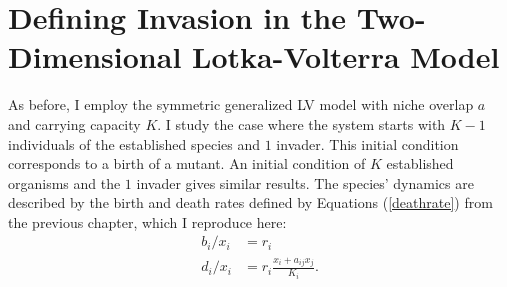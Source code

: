 \section{Defining Invasion in the Two-Dimensional Lotka-Volterra Model}

As before, I employ the symmetric generalized LV model with niche overlap $a$ and carrying capacity $K$. 
I study the case where the system starts with $K-1$ individuals of the established species and $1$ invader. 
This initial condition corresponds to a birth of a mutant. 
An initial condition of $K$ established organisms and the $1$ invader gives similar results. 
The species' dynamics are described by the birth and death rates defined by Equations (\ref{deathrate}) from the previous chapter, which I reproduce here:
\begin{align*}
	b_i/x_i &= r_i \\
	d_i/x_i &= r_i\frac{x_i+a_{ij}x_j}{K_i}. 
\end{align*}

